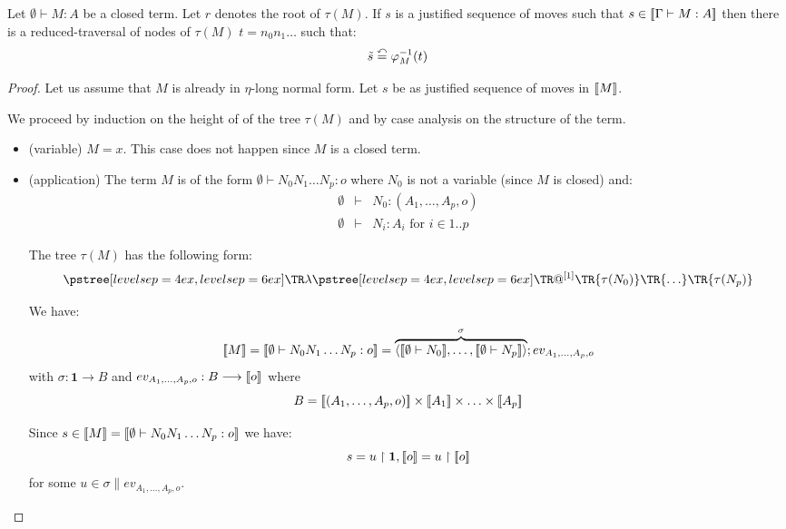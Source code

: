 \begin{prop}
\label{prop:rel_gamesem_redtrav_closed}
Let $\emptyset \vdash M : A$ be a closed term.
Let $r$ denotes the root of $\tau(M)$. If $s$ is a justified sequence of moves such
that $s \in {[\![\Gamma \vdash M:A ]\!]}$ then there is a reduced-traversal of nodes of $\tau(M)$
$t = n_0 n_1 \ldots$ such that:
 $$\tilde{s} \stackrel{\curvearrowleft}{=}  \varphi_M^{-1} (t)$$
\end{prop}
\begin{proof}
Let us assume that $M$ is already in $\eta$-long normal form.
Let $s$ be as justified sequence of moves in ${[\![ M ]\!]}$.

We proceed by induction on the height of of
the tree $\tau(M)$ and by case analysis on the structure of the term.

\begin{itemize}
  \item (variable) $M = x$. This case does not happen since $M$ is a closed term.

    \item (application) The term $M$ is of the form $\emptyset \vdash N_0 N_1 \ldots N_p : o$ where $N_0$ is not
    a variable (since $M$ is closed) and:
    \begin{eqnarray*}
    \emptyset &\vdash& N_0 : (A_1,\ldots,A_p,o)\\
    \emptyset &\vdash& N_i : A_i \mbox{ for } i \in 1..p
    \end{eqnarray*}

    The tree $\tau(M)$ has the following form:
    $$ \tree[levelsep=6ex]{\lambda}
        { \tree[levelsep=6ex]{@^{[1]}}
            {   \TR{\tau(N_0)} \TR{\ldots} \TR{\tau(N_p)}}}
    $$

    We have:
    $$\sem{M} = \sem{\emptyset \vdash N_0 N_1 \ldots N_p : o} = \overbrace{\langle \sem{\emptyset \vdash N_0}, \ldots, \sem{\emptyset \vdash N_p} \rangle}^\sigma ; ev_{A_1,\ldots,A_p,o}$$
    with $\sigma : \textbf{1} \longrightarrow B$ and $ev_{A_1,\ldots,A_p,o} : B \longrightarrow {[\![o ]\!]}$ where
    $$ B = {[\![ (A_1,\ldots,A_p,o) ]\!]} \times {[\![A_1 ]\!]} \times \ldots \times {[\![A_p ]\!]} $$

    Since $s \in {[\![M ]\!]} = {[\![ \emptyset \vdash N_0 N_1 \ldots N_p : o ]\!]}$ we have:
    \begin{equation*}
        s = u \upharpoonright \textbf{1},{[\![ o ]\!]} = u \upharpoonright {[\![o ]\!]}
    \end{equation*}
    for some $u \in \sigma \parallel ev_{A_1,\ldots,A_p,o}$.


\end{itemize}
\end{proof}
